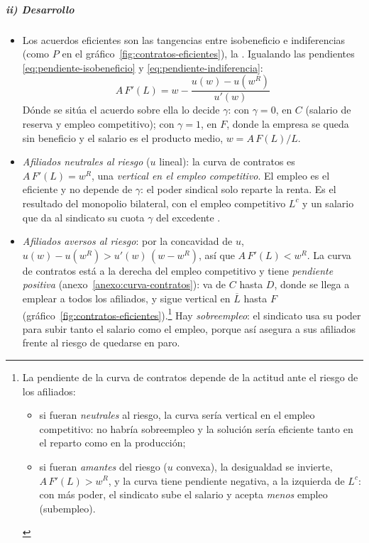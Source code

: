 \documentclass[11pt]{article}
\begin{document}
\subparagraph{ii) Desarrollo}

\begin{itemize}
\item Los acuerdos eficientes son las tangencias entre isobeneficio e indiferencias (como $P$ en el gráfico~\ref{fig:contratos-eficientes}), la . Igualando las pendientes \eqref{eq:pendiente-isobeneficio} y \eqref{eq:pendiente-indiferencia}:
  \begin{equation}
  A\,F'(L)=w-\frac{u(w)-u(w^R)}{u'(w)} \label{eq:curva-contratos}
  \end{equation}
  Dónde se sitúa el acuerdo sobre ella lo decide $\gamma$: con $\gamma=0$, en $C$ (salario de reserva y empleo competitivo); con $\gamma=1$, en $F$, donde la empresa se queda sin beneficio y el salario es el producto medio, $w=A\,F(L)/L$.
\item \emph{Afiliados neutrales al riesgo} ($u$ lineal): la curva de contratos es $A\,F'(L)=w^R$, una \emph{vertical en el empleo competitivo}. El empleo es el eficiente y no depende de $\gamma$: el poder sindical solo reparte la renta. Es el resultado del monopolio bilateral, con el empleo competitivo $L^c$ y un salario que da al sindicato su cuota $\gamma$ del excedente .
\item \emph{Afiliados aversos al riesgo}: por la concavidad de $u$, $u(w)-u(w^R)>u'(w)\,(w-w^R)$, así que $A\,F'(L)<w^R$. La curva de contratos está a la derecha del empleo competitivo y tiene \emph{pendiente positiva} (anexo~\ref{anexo:curva-contratos}): va de $C$ hasta $D$, donde se llega a emplear a todos los afiliados, y sigue vertical en $\overline{L}$ hasta $F$ (gráfico~\ref{fig:contratos-eficientes}).\footnote{La pendiente de la curva de contratos depende de la actitud ante el riesgo de los afiliados\nocite{Booth1995Economics}:
\begin{itemize}
\item si fueran \emph{neutrales} al riesgo, la curva sería vertical en el empleo competitivo: no habría sobreempleo y la solución sería eficiente tanto en el reparto como en la producción;
\item si fueran \emph{amantes} del riesgo ($u$ convexa), la desigualdad se invierte, $A\,F'(L)>w^R$, y la curva tiene pendiente negativa, a la izquierda de $L^c$: con más poder, el sindicato sube el salario y acepta \emph{menos} empleo (subempleo).
\end{itemize}} Hay \emph{sobreempleo}: el sindicato usa su poder para subir tanto el salario como el empleo, porque así asegura a sus afiliados frente al riesgo de quedarse en paro.
\end{itemize}
\end{document}
